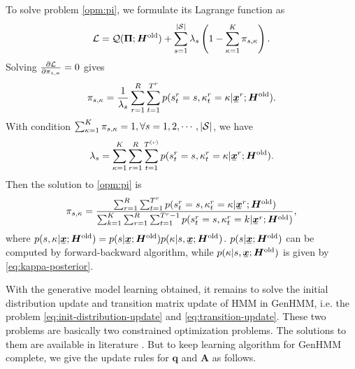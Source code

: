 \documentclass{ecai}
\newcommand{\ubar}[1]{\mkern2mu\underline{\mkern-2mu #1\mkern-2mu}\mkern2mu}
\newcommand{\ubm}[1]{\ubar{\bm{#1}}}
\newcommand{\ubmr}[2]{\ubar{\bm{#1}}^{#2}}
\newcommand{\smtr}[3]{{#1}^{#3}_{#2}}
\begin{document}
To solve problem \eqref{opm:pi}, we formulate its Lagrange function as
\begin{equation}
  \mathcal{L} = \mathcal{Q}(\bm{\Pi}; \bm{H}^{\mathrm{old}}) + \sum_{s=1}^{|\mathcal{S}|} \lambda_s\left( 1-  \sum_{\kappa=1}^{K}\pi_{s, \kappa}  \right).
\end{equation}
Solving $\frac{ \partial \mathcal{L}}{\partial \pi_{s, \kappa}} = 0$ gives
\begin{equation}
  \pi_{s,\kappa} = \frac{1}{\lambda_s}\sum_{r=1}^{R} \sum_{t=1}^{{T}^{r}} p(\smtr{s}{t}{r}=s, \smtr{\kappa}{t}{r} =\kappa| \ubmr{x}{r}; \bm{H}^{\mathrm{old}}).
\end{equation}
With condition $\sum_{\kappa=1}^{K} \pi_{s, \kappa}= 1, \forall s = 1, 2, \cdots, |\mathcal{S}|$, we have
\begin{equation}
  \lambda_s = \sum_{\kappa=1}^{K}\sum_{r=1}^{R} \sum_{t=1}^{{T}^{(r)}} p(\smtr{s}{t}{r}=s, \smtr{\kappa}{t}{r} =\kappa | \ubmr{x}{r}; \bm{H}^{\mathrm{old}}).
\end{equation}
Then the solution to \eqref{opm:pi} is
\begin{equation}\label{eq:mix-latent-parameter-solution}
  \pi_{s, \kappa} = \frac{\sum_{r=1}^{R} \sum_{t=1}^{{T}^{r}} p(\smtr{s}{t}{r} =s, \smtr{\kappa}{t}{r}=\kappa | \ubmr{x}{r}; \bm{H}^{\mathrm{old}}) }{\sum_{k =1}^{K}\sum_{r=1}^{R} \sum_{t=1}^{{T}^{r}-1} p(\smtr{s}{t}{r} =s, \smtr{\kappa}{t}{r}=k | \ubmr{x}{r}; \bm{H}^{\mathrm{old}}) },
\end{equation}
where $p(s, \kappa | \ubm{x}; \bm{H}^{\mathrm{old}}) = p(s| \ubm{x}; \bm{H}^{\mathrm{old}}) p(\kappa | s, \ubm{x}; \bm{H}^{\mathrm{old}})$. $p(s| \ubm{x}; \bm{H}^{\mathrm{old}})$ can be computed by forward-backward algorithm, while $p(\kappa | s, \ubm{x}; \bm{H}^{\mathrm{old}})$ is given by \eqref{eq:kappa-posterior}.


With the generative model learning obtained, it remains to solve the initial distribution update and transition matrix update of HMM in GenHMM, i.e. the problem \eqref{eq:init-distribution-update} and \eqref{eq:transition-update}. These two problems are basically two constrained optimization problems. The solutions to them are available in literature \cite{Bishop:2006:PRM:1162264}. But to keep learning algorithm for GenHMM complete, we give the update rules for $\bm{q}$ and $\bm{A}$ as follows.
\end{document}
